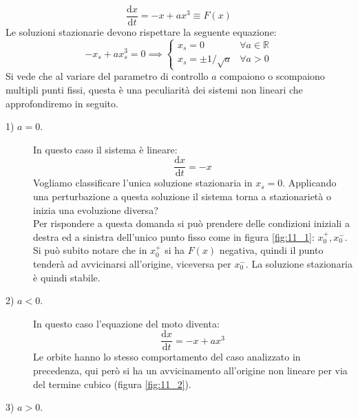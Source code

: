 \begin{exmp}
    \[
	\frac{\text{d} x}{\text{d} t} = -x + ax^3 \equiv F(x)
    \] 
    Le soluzioni stazionarie devono rispettare la seguente equazione:
    \[
        -x_s + ax_s^3 = 0 \implies  
	\begin{cases}
	    x_s = 0 & \forall a \in \mathbb{R}\\
	    x_s = \pm 1 / \sqrt{a} & \forall a > 0
        \end{cases}
    \] 
    Si vede che al variare del parametro di controllo $a$ compaiono o scompaiono multipli punti fissi, questa è una peculiarità dei sistemi non lineari che approfondiremo in seguito. 
    \begin{description}
	\item[1) $a = 0$.] In questo caso il sistema è lineare:
	    \[
	        \frac{\text{d} x}{\text{d} t} = -x
	    \] 
	    Vogliamo classificare l'unica soluzione stazionaria in $x_s = 0$. Applicando una perturbazione a questa soluzione il sistema torna a stazionarietà o inizia una evoluzione diversa? \\
	    Per rispondere a questa domanda si può prendere delle condizioni iniziali a destra ed a sinistra dell'unico punto fisso come in figura \ref{fig:11_1}: $x_0^+, x_0^-$. \\
	    Si può subito notare che in $x_0^+$ si ha $F(x)$ negativa, quindi il punto tenderà ad avvicinarsi all'origine, viceversa per $x_0^-$. La soluzione stazionaria è quindi stabile.
        \item[2) $a < 0$.] 
	    In questo caso l'equazione del moto diventa:
	    \[
	        \frac{\text{d} x}{\text{d} t} = -x + ax^3
	    \] 
	    Le orbite hanno lo stesso comportamento del caso analizzato in precedenza, qui però si ha un avvicinamento all'origine non lineare per via del termine cubico (figura \ref{fig:11_2}).
	\item[3) $a>0$.]
\end{description}
\end{exmp}
